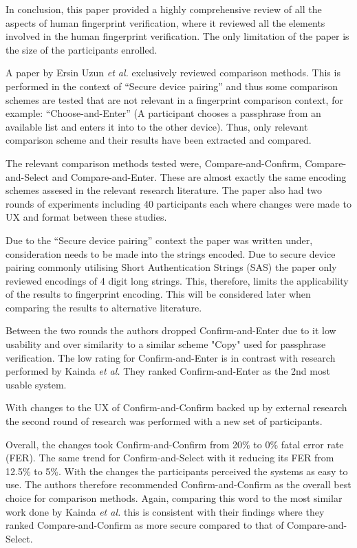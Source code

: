In conclusion, this paper provided a highly comprehensive review of all the aspects of human fingerprint verification, where it reviewed all the elements involved in the human fingerprint verification. The only limitation of the paper is the size of the participants enrolled.

A paper by Ersin Uzun \textit{et al.} exclusively reviewed comparison methods. This is performed in the context of ``Secure device pairing'' and thus some comparison schemes are tested that are not relevant in a fingerprint comparison context, for example:  ``Choose-and-Enter'' (A participant chooses a passphrase from an available list and enters it into to the other device). Thus, only relevant comparison scheme and their results have been extracted and compared. 

The relevant comparison methods tested were, Compare-and-Confirm, Compare-and-Select and Compare-and-Enter. These are almost exactly the same encoding schemes assesed in the relevant research literature. The paper also had two rounds of experiments including 40 participants each where changes were made to UX and format between these studies.

Due to the ``Secure device pairing'' context the paper was written under, consideration needs to be made into the strings encoded. Due to secure device pairing commonly utilising Short Authentication Strings (SAS) the paper only reviewed encodings of 4 digit long strings. This, therefore, limits the applicability of the results to fingerprint encoding. This will be considered later when comparing the results to alternative literature.

Between the two rounds the authors dropped Confirm-and-Enter due to it low usability and over similarity to a similar scheme "Copy" used for passphrase verification. The low rating for Confirm-and-Enter is in contrast with research performed by Kainda \textit{et al.}\cite{kainda2009usability} They ranked Confirm-and-Enter as the 2nd most usable system.

With changes to the UX of Confirm-and-Confirm backed up by external research \cite{palmer1990attentional}\cite{hammer2009category} the second round of research was performed with a new set of participants.

Overall, the changes took Confirm-and-Confirm from 20\% to 0\% fatal error rate (FER). The same trend for Confirm-and-Select with it reducing its FER from 12.5\% to 5\%. With the changes the participants perceived the systems as easy to use. The authors therefore recommended Confirm-and-Confirm as the overall best choice for comparison methods. Again, comparing this word to the most similar work done by Kainda \textit{et al.}\cite{kainda2009usability} this is consistent with their findings where they ranked Compare-and-Confirm as more secure compared to that of Compare-and-Select.

